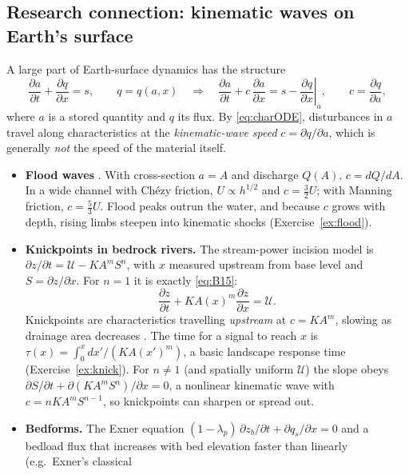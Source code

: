 \documentclass[11pt,letterpaper]{article}
\numberwithin{equation}{section}
\newcommand{\pd}[2]{\frac{\partial #1}{\partial #2}}
\newcommand{\Up}{\mathcal{U}}
\begin{document}
\subsection{Research connection: kinematic waves on Earth's surface}
\begin{research}[conservation law $+$ flux law $=$ kinematic wave]
A large part of Earth-surface dynamics has the structure
\begin{equation}\label{eq:kinwave}
\pd{a}{t}+\pd{q}{x}=s,\qquad q=q(a,x)\quad\Longrightarrow\quad
\pd{a}{t}+c\,\pd{a}{x}=s-\left.\pd{q}{x}\right|_{a},\qquad c=\pd{q}{a},
\end{equation}
where $a$ is a stored quantity and $q$ its flux. By \eqref{eq:charODE}, disturbances in $a$ travel along
characteristics at the \emph{kinematic-wave speed} $c=\partial q/\partial a$, which is generally \emph{not} the
speed of the material itself.
\begin{itemize}[leftmargin=1.2em]
  \item \textbf{Flood waves} \citep{lighthill1955}. With cross-section $a=A$ and discharge $Q(A)$, $c=dQ/dA$.
        In a wide channel with Ch\'ezy friction, $U\propto h^{1/2}$ and $c=\tfrac32U$; with Manning friction,
        $c=\tfrac53U$. Flood peaks outrun the water, and because $c$ grows with depth, rising limbs steepen into
        kinematic shocks (Exercise~\ref{ex:flood}).
  \item \textbf{Knickpoints in bedrock rivers.} The stream-power incision model is
        $\partial z/\partial t=\Up-KA^mS^n$, with $x$ measured upstream from base level and $S=\partial z/\partial x$.
        For $n=1$ it is exactly \eqref{eq:B15}:
        \begin{equation}\label{eq:streampower}
        \pd{z}{t}+K A(x)^m\pd{z}{x}=\Up .
        \end{equation}
        Knickpoints are characteristics travelling \emph{upstream} at $c=KA^m$, slowing as drainage area
        decreases \citep{rosenbloom1994,whipple1999}. The time for a signal to reach $x$ is
        $\tau(x)=\int_0^x dx'/(KA(x')^m)$, a basic landscape response time (Exercise~\ref{ex:knick}).
        For $n\neq1$ (and spatially uniform $\Up$) the slope obeys $\partial S/\partial t+\partial(KA^mS^n)/\partial x=0$, a nonlinear kinematic
        wave with $c=nKA^mS^{n-1}$, so knickpoints can sharpen or spread out.
  \item \textbf{Bedforms.} The Exner equation $(1-\lambda_p)\,\partial z_b/\partial t+\partial q_s/\partial x=0$
        and a bedload flux that increases with bed elevation faster than linearly (e.g.\ Exner's classical

\end{itemize}
\end{research}
\end{document}
